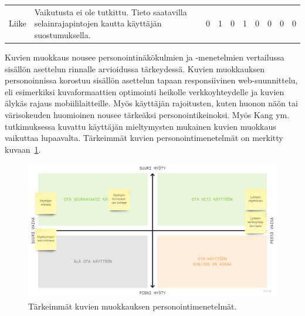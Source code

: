 \documentclass[finnish, 12pt, a4paper, elec, utf8, a-1b, online]{aaltothesis}
\begin{document}
{\begin{longtable}{p{2.5cm}|p{6cm}|p{0.5cm}p{0.5cm}p{0.5cm}|p{0.5cm}|p{0.5cm}p{0.5cm}p{0.5cm}|p{0.5cm}|}
        \midrule
        Liike                                  & Vaikutusta ei ole tutkittu. Tieto saatavilla selainrajapintojen kautta käyttäjän suostumuksella.                                                                                                                                                                                                                                                                          & 0                                          & 1                                   & 0                                      & 1                            & 0                                               & 0                                         & 0                                         & 0                            \\
    \end{longtable}
}

Kuvien muokkaus nousee personointinäkökulmien ja -menetelmien vertailussa
sisällön asettelun rinnalle arvioidussa tärkeydessä. Kuvien muokkauksen
personoinnissa korostuu sisällön asettelun tapaan responsiivinen
web-suunnittelu, eli esimerkiksi kuvaformaattien optimointi heikolle
verkkoyhteydelle ja kuvien älykäs rajaus mobiililaitteille. Myös käyttäjän
rajoitusten, kuten huonon näön tai värisokeuden huomioinen nousee tärkeäksi
personointikeinoksi. Myös Kang ym.~\cite{5539850} tutkimuksessa kuvattu
käyttäjän mieltymysten mukainen kuvien muokkaus vaikuttaa lupaavalta. Tärkeimmät
kuvien personointimenetelmät on merkitty kuvaan~\ref{fig:images-priorization}.

\begin{figure}[htb]
    \centering
    \includegraphics[width=\textwidth]{images/images-priorization.pdf}
    \caption{Tärkeimmät kuvien muokkauksen personointimenetelmät.~\label{fig:images-priorization}}
\end{figure}
\end{document}
